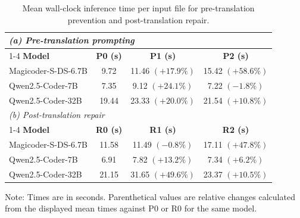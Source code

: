 \begin{table}[t]
\caption{Mean wall-clock inference time per input file for pre-translation prevention and post-translation repair.}
  \label{tab:prompt-repair-latency}
  \centering
  \small
  \setlength{\tabcolsep}{5pt}
  \begin{tabular}{lccc}
    \toprule
    \multicolumn{4}{l}{\textit{(a) Pre-translation prompting}} \\
    \cmidrule(lr){1-4}
\textbf{Model}
  & \textbf{P0 (s)}
  & \textbf{P1 (s)}
  & \textbf{P2 (s)}  \\
    \midrule
    Magicoder-S-DS-6.7B
      & 9.72
      & 11.46 $(+17.9\%)$
      & 15.42 $(+58.6\%)$ \\
    Qwen2.5-Coder-7B
      & 7.35
      & 9.12 $(+24.1\%)$
      & 7.22 $(-1.8\%)$ \\
    Qwen2.5-Coder-32B
      & 19.44
      & 23.33 $(+20.0\%)$
      & 21.54 $(+10.8\%)$ \\
    \midrule
    \multicolumn{4}{l}{\textit{(b) Post-translation repair}} \\
    \cmidrule(lr){1-4}
\textbf{Model}
  & \textbf{R0 (s)}
  & \textbf{R1 (s)}
  & \textbf{R2 (s)}  \\
    \midrule
    Magicoder-S-DS-6.7B
      & 11.58
      & 11.49 $(-0.8\%)$
      & 17.11 $(+47.8\%)$ \\
    Qwen2.5-Coder-7B 
      & 6.91
      & 7.82 $(+13.2\%)$
      & 7.34 $(+6.2\%)$ \\
    Qwen2.5-Coder-32B 
      & 21.15
      & 31.65 $(+49.6\%)$
      & 23.37 $(+10.5\%)$ \\
    \bottomrule
  \end{tabular}
  \par\smallskip
  \begin{minipage}{0.95\linewidth}
  \footnotesize
  Note: Times are in seconds. Parenthetical values are relative changes calculated from the displayed mean times against P0 or R0 for the same model.
  \end{minipage}
\end{table}
